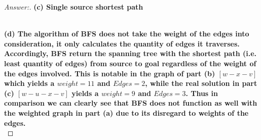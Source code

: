 \documentclass[11pt]{article}
\theoremstyle{definition}
\theoremstyle{definition}
\theoremstyle{definition}
\begin{document}
\begin{proof}[Answer:]
\item \textbf{(c) Single source shortest path} \\
\begin{center}
\end{center}

\item \textbf{\\ (d) The algorithm of BFS does not take the weight of the edges into consideration, it only calculates the quantity of edges it traverses. Accordingly, BFS return the spanning tree with the shortest path (i.e. least quantity of edges) from source to goal regardless of the weight of the edges involved. This is notable in the graph of part (b) $[w-x-v]$ which yields a $weight=11$ and $Edges=2$, while the real solution in part (c) $[w-u-x-v]$ yields a $weight=9$ and $Edges=3$. Thus in comparison we can clearly see that BFS does not function as well with the weighted graph in part (a) due to its disregard to weights of the edges.} \\
\end{proof}

\end{document}
